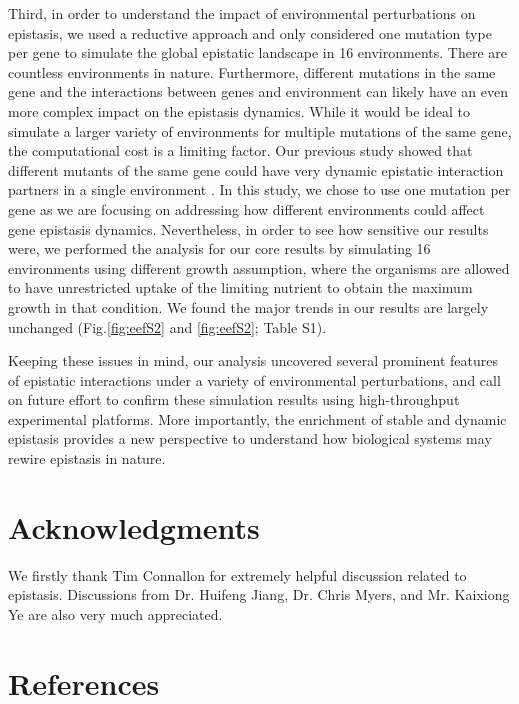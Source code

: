 \documentclass[10pt]{article}
\newcommand{\Figs}{Fig.} %
\newcommand{\citep}{\cite}
\begin{document}
Third, in order to understand the impact of environmental
perturbations on epistasis, we used a reductive approach and only
considered one mutation type per gene to simulate the global epistatic
landscape in 16 environments. There are countless environments in
nature. Furthermore, different mutations in the same gene and the
interactions between genes and environment can likely have an even
more complex impact on the epistasis dynamics. While it would be ideal
to simulate a larger variety of environments for multiple
mutations of the same gene, the computational cost is a limiting
factor. Our previous study showed that different mutants of the same
gene could have very dynamic epistatic interaction partners in a
single environment \citep{Xu2012}. In this study, we chose to use one
mutation per gene as we are focusing on addressing how different
environments could affect gene epistasis dynamics. Nevertheless, in
order to see how sensitive our results were, we performed the analysis
for our core results by simulating 16 environments using different
growth assumption, where the organisms are allowed to have
unrestricted uptake of the limiting nutrient to obtain the maximum
growth in that condition. We found the major trends in our results are
largely unchanged (\Figs \ref{fig:eefS2} and \ref{fig:eefS2}; Table S1).

Keeping these issues in mind, our analysis uncovered several prominent
features of epistatic interactions under a variety of environmental
perturbations, and call on future effort to confirm these simulation
results using high-throughput experimental platforms. More
importantly, the enrichment of stable and dynamic epistasis provides a
new perspective to understand how biological systems may rewire
epistasis in nature.


\section*{Acknowledgments}

We firstly thank Tim Connallon for extremely helpful discussion
related to epistasis. Discussions from Dr. Huifeng Jiang, Dr. Chris
Myers, and Mr. Kaixiong Ye are also very much appreciated.

\section*{References}
\end{document}
